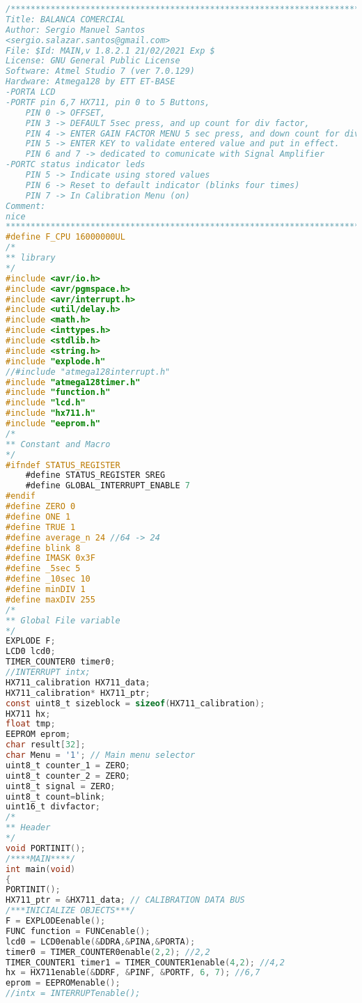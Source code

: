 \begin{lstlisting}[language=C, caption={main.c}, label=main-c, captionpos=b]
/************************************************************************
Title: BALANCA COMERCIAL
Author: Sergio Manuel Santos
<sergio.salazar.santos@gmail.com>
File: $Id: MAIN,v 1.8.2.1 21/02/2021 Exp $
License: GNU General Public License
Software: Atmel Studio 7 (ver 7.0.129)
Hardware: Atmega128 by ETT ET-BASE
-PORTA LCD
-PORTF pin 6,7 HX711, pin 0 to 5 Buttons, 
	PIN 0 -> OFFSET, 
	PIN 3 -> DEFAULT 5sec press, and up count for div factor, 
	PIN 4 -> ENTER GAIN FACTOR MENU 5 sec press, and down count for div factor, 
	PIN 5 -> ENTER KEY to validate entered value and put in effect.
	PIN 6 and 7 -> dedicated to comunicate with Signal Amplifier
-PORTC status indicator leds
	PIN 5 -> Indicate using stored values
	PIN 6 -> Reset to default indicator (blinks four times)
	PIN 7 -> In Calibration Menu (on)
Comment:
nice
************************************************************************/
#define F_CPU 16000000UL
/*
** library
*/
#include <avr/io.h>
#include <avr/pgmspace.h>
#include <avr/interrupt.h>
#include <util/delay.h>
#include <math.h>
#include <inttypes.h>
#include <stdlib.h>
#include <string.h>
#include "explode.h"
//#include "atmega128interrupt.h"
#include "atmega128timer.h"
#include "function.h"
#include "lcd.h"
#include "hx711.h"
#include "eeprom.h"
/*
** Constant and Macro
*/
#ifndef STATUS_REGISTER
	#define STATUS_REGISTER SREG
	#define GLOBAL_INTERRUPT_ENABLE 7
#endif
#define ZERO 0
#define ONE 1
#define TRUE 1
#define average_n 24 //64 -> 24
#define blink 8
#define IMASK 0x3F
#define _5sec 5
#define _10sec 10
#define minDIV 1
#define maxDIV 255
/*
** Global File variable
*/
EXPLODE F;
LCD0 lcd0;
TIMER_COUNTER0 timer0;
//INTERRUPT intx;
HX711_calibration HX711_data;
HX711_calibration* HX711_ptr;
const uint8_t sizeblock = sizeof(HX711_calibration);
HX711 hx;
float tmp;
EEPROM eprom;
char result[32];
char Menu = '1'; // Main menu selector
uint8_t counter_1 = ZERO;
uint8_t counter_2 = ZERO;
uint8_t signal = ZERO;
uint8_t count=blink;
uint16_t divfactor;
/*
** Header
*/
void PORTINIT();
/****MAIN****/
int main(void)
{
PORTINIT();
HX711_ptr = &HX711_data; // CALIBRATION DATA BUS
/***INICIALIZE OBJECTS***/
F = EXPLODEenable();
FUNC function = FUNCenable();
lcd0 = LCD0enable(&DDRA,&PINA,&PORTA);
timer0 = TIMER_COUNTER0enable(2,2); //2,2
TIMER_COUNTER1 timer1 = TIMER_COUNTER1enable(4,2); //4,2
hx = HX711enable(&DDRF, &PINF, &PORTF, 6, 7); //6,7
eprom = EEPROMenable();
//intx = INTERRUPTenable();

\end{lstlisting}
